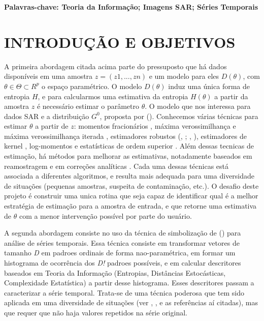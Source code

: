 \documentclass[12pt,letterpaper]{article}
\begin{document}
\textbf{Palavras-chave: Teoria da Informação; Imagens SAR; Séries Temporais} 
  
  \newpage
\section*{\centering \textbf{INTRODUÇÃO E OBJETIVOS}} %

A primeira abordagem citada acima parte do pressuposto que há dados disponíveis em uma amostra $z = (z1, . . . , zn)$ e um modelo para eles $D(\theta)$, com $\theta \in \Theta \subset R ^ p$ o espaço paramétrico. O modelo $D(\theta)$ induz uma única forma de entropia $H$, e para calcularmos uma estimativa da entropia $H(\theta)$ a partir da amostra $z$ é necessário estimar o parâmetro $\theta$. O modelo que nos interessa para dados SAR e a distribuição $G^0$, proposta por  (\citeyear{FreryMullerYanasse1997}). Conhecemos várias técnicas para estimar $\theta$ a partir de $z$: momentos fracionários \cite{MejailBerllesFreryBustos2003}, máxima verossimilhança e máxima verossimilhança iterada \cite{FreryNetoSouza2004}, estimadores robustos (, \citeyear{BustusLuciniFrery2002}; , \citeyear{AllendeFreryGalbiatiPizarro2006}), estimadores de kernel \cite{GambiniCassettiLuciniFrery2014}, log-momentos e estatísticas de ordem superior \cite{DengLopez2016}. Além dessas tecnicas de estimação, há métodos para melhorar as estimativas, notadamente baseados em reamostragem \cite{CribariFrerySilva2002} e em correções analíticas \cite{SilvaNetoFrery2008}. Cada uma dessas técnicas está associada a diferentes algoritmos, e resulta mais adequada para uma diversidade de situações (pequenas amostras, suspeita de contaminação, etc.). O desafio deste projeto é construir uma unica rotina que seja capaz de identificar qual é a melhor estratégia de estimação para a amostra de entrada, e que retorne uma estimativa de $\theta$ com a menor intervenção possível por parte do usuário.

A segunda abordagem consiste no uso da técnica de simbolização de  (\citeyear{BandtPompe2002}) para análise de séries temporais. Essa técnica consiste em transformar vetores de tamanho \textit{D} em padroes ordinais de forma nao-paramétrica, em formar um histograma de ocorrência dos \textit{D!} padroes possíveis, e em calcular descritores baseados em Teoria da Informação (Entropias, Distâncias Estocásticas, Complexidade Estatística) a partir desse histograma. Esses descritores passam a caracterizar a série temporal. Trata-se de uma técnica poderosa que tem sido aplicada em uma diversidade de situações (ver , \citeyear{RossoOspinaFrery2016}, e as referências aí citadas), mas que requer que não haja valores repetidos na série original.
\end{document}
